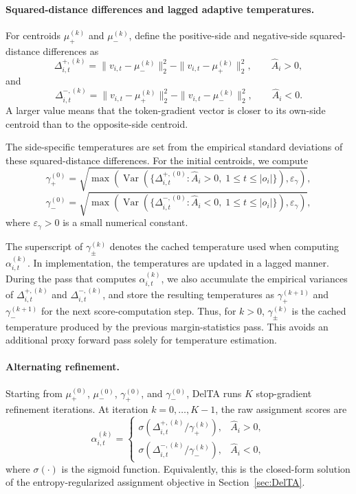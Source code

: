 \documentclass{llmxive}
\begin{document}
\paragraph{Squared-distance differences and lagged adaptive temperatures.}
For centroids \(\mu_+^{(k)}\) and \(\mu_-^{(k)}\), define the positive-side and negative-side squared-distance differences as
\[
\Delta_{i,t}^{+,(k)}
=
\|v_{i,t}-\mu_-^{(k)}\|_2^2
-
\|v_{i,t}-\mu_+^{(k)}\|_2^2,
\qquad \hat A_i>0,
\]
and
\[
\Delta_{i,t}^{-,(k)}
=
\|v_{i,t}-\mu_+^{(k)}\|_2^2
-
\|v_{i,t}-\mu_-^{(k)}\|_2^2,
\qquad \hat A_i<0.
\]
A larger value means that the token-gradient vector is closer to its own-side centroid than to the opposite-side centroid.

The side-specific temperatures are set from the empirical standard deviations of these squared-distance differences.
For the initial centroids, we compute
\[
\gamma_+^{(0)}
=
\sqrt{
\max\!\left(
\operatorname{Var}\!\left(
\{\Delta_{i,t}^{+,(0)}:\hat A_i>0,\;1\le t\le |o_i|\}
\right),
\varepsilon_\gamma
\right)
},
\]
\[
\gamma_-^{(0)}
=
\sqrt{
\max\!\left(
\operatorname{Var}\!\left(
\{\Delta_{i,t}^{-,(0)}:\hat A_i<0,\;1\le t\le |o_i|\}
\right),
\varepsilon_\gamma
\right)
},
\]
where \(\varepsilon_\gamma>0\) is a small numerical constant.

The superscript of \(\gamma_\pm^{(k)}\) denotes the cached temperature used when computing \(\alpha_{i,t}^{(k)}\).
In implementation, the temperatures are updated in a lagged manner.
During the pass that computes \(\alpha_{i,t}^{(k)}\), we also accumulate the empirical variances of \(\Delta_{i,t}^{+,(k)}\) and \(\Delta_{i,t}^{-,(k)}\), and store the resulting temperatures as \(\gamma_+^{(k+1)}\) and \(\gamma_-^{(k+1)}\) for the next score-computation step.
Thus, for \(k>0\), \(\gamma_\pm^{(k)}\) is the cached temperature produced by the previous margin-statistics pass.
This avoids an additional proxy forward pass solely for temperature estimation.

\paragraph{Alternating refinement.}
Starting from \(\mu_+^{(0)}\), \(\mu_-^{(0)}\), \(\gamma_+^{(0)}\), and \(\gamma_-^{(0)}\), DelTA runs \(K\) stop-gradient refinement iterations.
At iteration \(k=0,\dots,K-1\), the raw assignment scores are
\[
\alpha_{i,t}^{(k)}
=
\begin{cases}
\sigma\!\left(
\Delta_{i,t}^{+,(k)}/\gamma_+^{(k)}
\right),
& \hat A_i>0,\\[1.0ex]
\sigma\!\left(
\Delta_{i,t}^{-,(k)}/\gamma_-^{(k)}
\right),
& \hat A_i<0,
\end{cases}
\]
where \(\sigma(\cdot)\) is the sigmoid function.
Equivalently, this is the closed-form solution of the entropy-regularized assignment objective in Section~\ref{sec:DelTA}.
\end{document}
